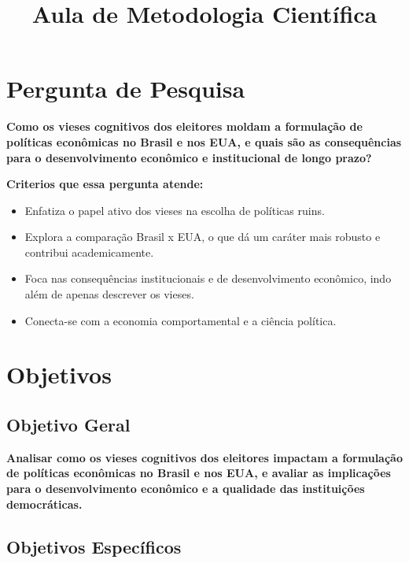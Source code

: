 \documentclass[
	article,
	12pt,
	oneside,
	a4paper,
	english,
	brazil,
	sumario=tradicional
]{abntex2}
\title{Aula de Metodologia Científica}
\begin{document}
\chapter{Pergunta de Pesquisa}



\textbf{Como os vieses cognitivos dos eleitores moldam a formulação de políticas econômicas no Brasil e nos EUA, e quais são as consequências para o desenvolvimento econômico e institucional de longo prazo?}


\textbf{Criterios que essa pergunta atende:}
\begin{itemize}
    \item Enfatiza o papel ativo dos vieses na escolha de políticas ruins.
    \item Explora a comparação Brasil x EUA, o que dá um caráter mais robusto e contribui academicamente.
    \item Foca nas consequências institucionais e de desenvolvimento econômico, indo além de apenas descrever os vieses.
    \item Conecta-se com a economia comportamental e a ciência política.
\end{itemize}










\newpage
\chapter{Objetivos}



\section{Objetivo Geral}

\textbf{Analisar como os vieses cognitivos dos eleitores impactam a formulação de políticas econômicas no Brasil e nos EUA, e avaliar as implicações para o desenvolvimento econômico e a qualidade das instituições democráticas.}

\section{Objetivos Específicos}
\end{document}
